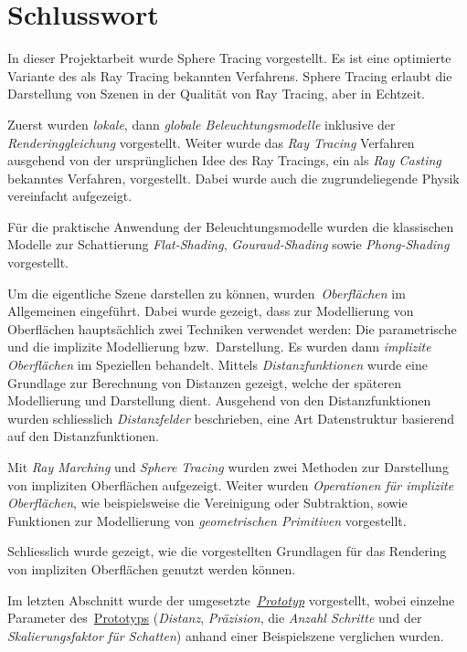 
\chapter{Schlusswort}
\label{chap:discussion_and_conclusion}

In dieser Projektarbeit wurde Sphere Tracing vorgestellt. Es ist eine
optimierte Variante des als Ray Tracing bekannten Verfahrens.  Sphere
Tracing erlaubt die Darstellung von Szenen in der Qualität von Ray
Tracing, aber in Echtzeit.

Zuerst wurden \textit{lokale}, dann \textit{globale Beleuchtungsmodelle} inklusive der
\textit{Renderinggleichung} vorgestellt. Weiter wurde das \textit{Ray Tracing}
Verfahren ausgehend von der ursprünglichen Idee des Ray Tracings, ein
als \textit{Ray Casting} bekanntes Verfahren, vorgestellt. Dabei wurde auch die
zugrundeliegende Physik vereinfacht aufgezeigt.

Für die praktische Anwendung der Beleuchtungsmodelle wurden die
klassischen Modelle zur Schattierung \textit{Flat-Shading},
\textit{Gouraud-Shading} sowie \textit{Phong-Shading} vorgestellt.

Um die eigentliche Szene darstellen zu können,
wurden~\textit{Oberflächen} im Allgemeinen eingeführt. Dabei wurde
gezeigt, dass zur Modellierung von Oberflächen hauptsächlich zwei
Techniken verwendet werden: Die parametrische und die implizite
Modellierung bzw.\ Darstellung. Es wurden dann \textit{implizite
    Oberflächen} im Speziellen behandelt. Mittels
\textit{Distanzfunktionen} wurde eine Grundlage zur Berechnung von
Distanzen gezeigt, welche der späteren Modellierung und Darstellung
dient. Ausgehend von den Distanzfunktionen wurden schliesslich
\textit{Distanzfelder} beschrieben, eine Art Datenstruktur basierend auf
den Distanzfunktionen.

Mit \textit{Ray Marching} und \textit{Sphere Tracing} wurden zwei
Methoden zur Darstellung von impliziten Oberflächen aufgezeigt. Weiter
wurden \textit{Operationen für implizite Oberflächen}, wie
beispielsweise die Vereinigung oder Subtraktion, sowie Funktionen zur
Modellierung von \textit{geometrischen Primitiven} vorgestellt.

Schliesslich wurde gezeigt, wie die vorgestellten Grundlagen für das
Rendering von impliziten Oberflächen genutzt werden können.

Im letzten Abschnitt wurde der
umgesetzte~\hyperref[chap:prototype]{\textit{Prototyp}} vorgestellt,
wobei einzelne Parameter des~\hyperref[chap:prototype]{Prototyps}
(\textit{Distanz}, \textit{Präzision}, die \textit{Anzahl Schritte} und
der \textit{Skalierungsfaktor für Schatten}) anhand einer Beispielszene
verglichen wurden.


